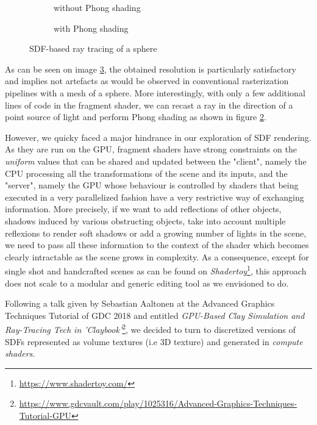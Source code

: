 \documentclass[10pt,a4paper,english, twocolumn]{article}
\begin{document}
\begin{figure}
    \begin{subfigure}{.5\linewidth}
        \centering
        \caption{without Phong shading}
        \label{sfig:sphere-tracing1}
    \end{subfigure}%
    \begin{subfigure}{.5\linewidth}
        \centering
        \caption{with Phong shading}
        \label{sfig:sphere-tracing2}
    \end{subfigure}
    \caption{SDF-based ray tracing of a sphere}
    \label{fig:sphere-tracing}
\end{figure}

As can be seen on image \ref{fig:sphere-tracing}, the obtained resolution is particularly satisfactory and implies not artefacts as would be observed in conventional rasterization pipelines with a mesh of a sphere. More interestingly, with only a few additional lines of code in the fragment shader, we can recast a ray in the direction of a point source of light and perform Phong shading as shown in figure \ref{sfig:sphere-tracing2}.

However, we quicky faced a major hindrance in our exploration of SDF rendering. As they are run on the GPU, fragment shaders have strong constraints on the \textit{uniform} values that can be shared and updated between the "client", namely the CPU processing all the transformations of the scene and its inputs, and the "server", namely the GPU whose behaviour is controlled by shaders that being executed in a very parallelized fashion have a very restrictive way of exchanging information. More precisely, if we want to add reflections of other objects, shadows induced by various obstructing objects, take into account multiple reflexions to render soft shadows or add a growing number of lights in the scene, we need to pass all these information to the context of the shader which becomes clearly intractable as the scene grows in complexity. As a consequence, except for single shot and handcrafted scenes as can be found on \textit{Shadertoy}\footnote{\url{https://www.shadertoy.com/}}, this approach does not scale to a modular and generic editing tool as we envisioned to do.

Following a talk given by Sebastian Aaltonen at the Advanced Graphics Techniques Tutorial of GDC 2018 and entitled \textit{GPU-Based Clay Simulation and Ray-Tracing Tech in 'Claybook'}\footnote{\url{https://www.gdcvault.com/play/1025316/Advanced-Graphics-Techniques-Tutorial-GPU}}, we decided to turn to discretized versions of SDFs represented as volume textures (i.e 3D texture) and generated in \textit{compute shaders}.
\end{document}

